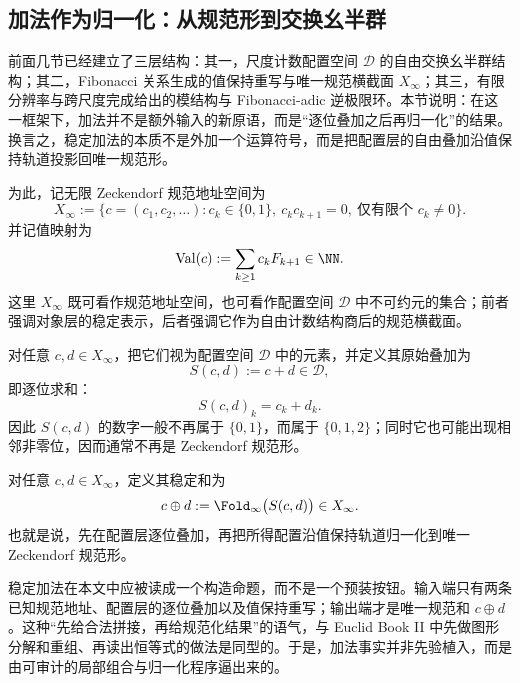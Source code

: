 \subsection{加法作为归一化：从规范形到交换幺半群}\label{subsec:emergent-arithmetic-stable-add}

前面几节已经建立了三层结构：其一，尺度计数配置空间 \(\mathcal D\) 的自由交换幺半群结构；其二，Fibonacci 关系生成的值保持重写与唯一规范横截面 \(X_\infty\)；其三，有限分辨率与跨尺度完成给出的模结构与 Fibonacci-adic 逆极限环。本节说明：在这一框架下，加法并不是额外输入的新原语，而是“逐位叠加之后再归一化”的结果。换言之，稳定加法的本质不是外加一个运算符号，而是把配置层的自由叠加沿值保持轨道投影回唯一规范形。

为此，记无限 Zeckendorf 规范地址空间为
\[
X_\infty
:=
\{c=(c_1,c_2,\dots): c_k\in\{0,1\},\ c_kc_{k+1}=0,\ \text{仅有限个 }c_k\neq 0\}.
\]
并记值映射为
\[
\mathrm{Val}(c):=\sum_{k\ge 1} c_k F_{k+1}\in \NN.
\]
这里 \(X_\infty\) 既可看作规范地址空间，也可看作配置空间 \(\mathcal D\) 中不可约元的集合；前者强调对象层的稳定表示，后者强调它作为自由计数结构商后的规范横截面。

\begin{definition}[原始叠加配置]
对任意 \(c,d\in X_\infty\)，把它们视为配置空间 \(\mathcal D\) 中的元素，并定义其原始叠加为
\[
S(c,d):=c+d\in \mathcal D,
\]
即逐位求和：
\[
S(c,d)_k=c_k+d_k.
\]
因此 \(S(c,d)\) 的数字一般不再属于 \(\{0,1\}\)，而属于 \(\{0,1,2\}\)；同时它也可能出现相邻非零位，因而通常不再是 Zeckendorf 规范形。
\end{definition}

\begin{definition}[稳定加法]\label{def:stable-add}
对任意 \(c,d\in X_\infty\)，定义其稳定和为
\[
c\oplus d
:=
\Fold_\infty\bigl(S(c,d)\bigr)
\in X_\infty.
\]
也就是说，先在配置层逐位叠加，再把所得配置沿值保持轨道归一化到唯一 Zeckendorf 规范形。
\end{definition}

\begin{remark}\label{rem:stable-add-bookII-constructive-reading}
稳定加法在本文中应被读成一个构造命题，而不是一个预装按钮。输入端只有两条已知规范地址、配置层的逐位叠加以及值保持重写；输出端才是唯一规范和 \(c\oplus d\)。这种“先给合法拼接，再给规范化结果”的语气，与 Euclid Book II 中先做图形分解和重组、再读出恒等式的做法是同型的。于是，加法事实并非先验植入，而是由可审计的局部组合与归一化程序逼出来的。
\end{remark}

